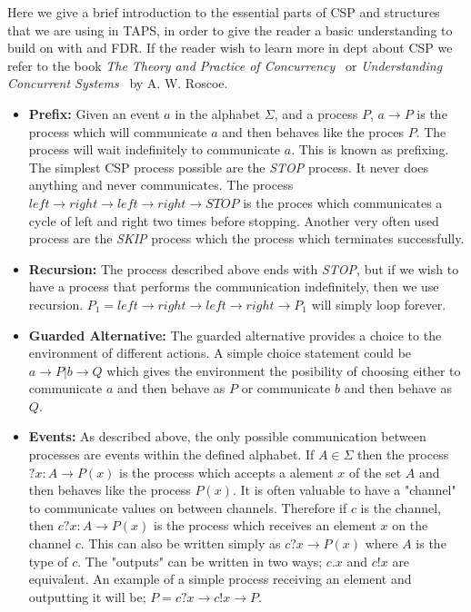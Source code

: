 Here we give a brief introduction to the essential parts of CSP and structures that we are using in TAPS, in order to give the reader a basic understanding to build on with \cspm and FDR. If the reader wish to learn more in dept about CSP we refer to the book \textit{The Theory and Practice of Concurrency}~\cite{Roscoe1997} or \textit{Understanding Concurrent Systems}~\cite{Roscoe2010} by A. W. Roscoe.
\begin{itemize}
    \item \textbf{Prefix:} Given an event $a$ in the alphabet $\Sigma$, and a process $P$, $a \rightarrow P$ is the process which will communicate $a$ and then behaves like the proces $P$. The process will wait indefinitely to communicate $a$. This is known as prefixing.\\
    The simplest CSP process possible are the \textit{STOP} process. It never does anything and never communicates. The process $left \rightarrow right \rightarrow left \rightarrow right \rightarrow STOP$ is the proces which communicates a cycle of left and right two times before stopping. Another very often used process are the \textit{SKIP} process which the process which terminates successfully.
    \item \textbf{Recursion:} The process described above ends with \textit{STOP}, but if we wish to have a process that performs the communication indefinitely, then we use recursion.
    $P_1 = left \rightarrow right \rightarrow left \rightarrow right \rightarrow P_1$ will simply loop forever.
    \item \textbf{Guarded Alternative:} The guarded alternative provides a choice to the environment of different actions. A simple choice statement could be $a \rightarrow P | b \rightarrow Q$ which gives the environment the posibility of choosing either to communicate $a$ and then behave as $P$ or communicate $b$ and then behave as $Q$.
    \item \textbf{Events:} As described above, the only possible communication between processes are events within the defined alphabet. If $A \in \Sigma$ then the process $?x : A \rightarrow P(x)$ is the process which accepts a alement $x$ of the set $A$ and then behaves like the process $P(x)$.
    It is often valuable to have a "channel" to communicate values on between channels. Therefore if $c$ is the channel, then $c?x : A \rightarrow P(x)$ is the process which receives an element $x$ on the channel $c$. This can also be written simply as $c?x \rightarrow P(x)$ where $A$ is the type of $c$. The "outputs" can be written in two ways; $c.x$ and $c!x$ are equivalent. An example of a simple process receiving an element and outputting it will be; $P = c?x \rightarrow c!x \rightarrow P$.

\end{itemize}
